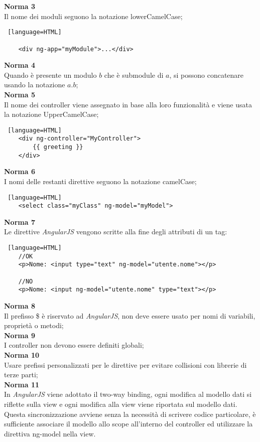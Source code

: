 \textbf{Norma 3}\\
Il nome dei moduli seguono la notazione lowerCamelCase;
\begin{lstlisting} [language=HTML]
	
	<div ng-app="myModule">...</div>

\end{lstlisting}
\textbf{Norma 4}\\
Quando è presente un modulo $b$ che è submodule di $a$, si possono concatenare usando la notazione $a.b$;\\
\textbf{Norma 5}\\
Il nome dei controller viene assegnato in base alla loro funzionalità e viene usata la notazione UpperCamelCase;
\begin{lstlisting} [language=HTML]
	<div ng-controller="MyController">
  		{{ greeting }}
	</div>
\end{lstlisting}
\textbf{Norma 6}\\
I nomi delle restanti direttive seguono la notazione camelCase;
\begin{lstlisting} [language=HTML]
	<select class="myClass" ng-model="myModel">
\end{lstlisting}
\textbf{Norma 7}\\
Le direttive \textit{AngularJS} vengono scritte alla fine degli attributi di un tag: 
\begin{lstlisting} [language=HTML]
	//OK
	<p>Nome: <input type="text" ng-model="utente.nome"></p>
	
	//NO
	<p>Nome: <input ng-model="utente.nome" type="text"></p>
\end{lstlisting}
\textbf{Norma 8}\\
Il prefisso \$ è riservato ad \textit{AngularJS}, non deve essere usato per nomi di variabili, proprietà o metodi;\\
\textbf{Norma 9}\\
I controller non devono essere definiti globali;\\
\textbf{Norma 10}\\
Usare prefissi personalizzati per le direttive per evitare collisioni con librerie di terze parti;\\
\textbf{Norma 11}\\
In \textit{AngularJS} viene adottato il two-way binding, ogni modifica al modello dati si riflette sulla view e ogni modifica alla view viene riportata sul modello dati.
Questa sincronizzazione avviene senza la necessità di scrivere codice particolare, è sufficiente associare il modello allo scope all'interno del controller ed utilizzare la direttiva ng-model nella view.


